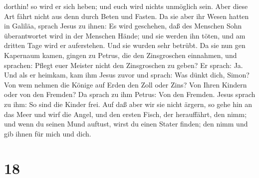 dorthin! so wird er sich heben; und euch wird nichts unmöglich sein.
 Aber diese Art fährt nicht aus denn durch Beten und
Fasten.  Da sie aber ihr Wesen hatten in Galiläa, sprach
Jesus zu ihnen: Es wird geschehen, daß des Menschen Sohn überantwortet
wird in der Menschen Hände;  und sie werden ihn töten, und
am dritten Tage wird er auferstehen. Und sie wurden sehr betrübt.
 Da sie nun gen Kapernaum kamen, gingen zu Petrus, die den
Zinsgroschen einnahmen, und sprachen: Pflegt euer Meister nicht den
Zinsgroschen zu geben?  Er sprach: Ja. Und als er heimkam,
kam ihm Jesus zuvor und sprach: Was dünkt dich, Simon? Von wem nehmen
die Könige auf Erden den Zoll oder Zins? Von Ihren Kindern oder von den
Fremden?  Da sprach zu ihm Petrus: Von den Fremden. Jesus
sprach zu ihm: So sind die Kinder frei.  Auf daß aber wir
sie nicht ärgern, so gehe hin an das Meer und wirf die Angel, und den
ersten Fisch, der herauffährt, den nimm; und wenn du seinen Mund
auftust, wirst du einen Stater finden; den nimm und gib ihnen für mich
und dich.

\hypertarget{section-17}{%
\section{18}\label{section-17}}


